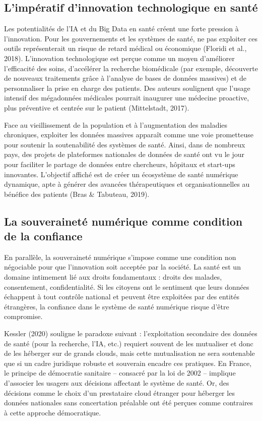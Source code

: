 \documentclass[10pt,a4paper]{article} %
\begin{document}
\subsection{L’impératif d’innovation technologique en santé}

Les potentialités de l’IA et du Big Data en santé créent une forte pression à l’innovation. Pour les gouvernements et les systèmes de santé, ne pas exploiter ces outils représenterait un risque de retard médical ou économique (Floridi et al., 2018). L’innovation technologique est perçue comme un moyen d’améliorer l’efficacité des soins, d’accélérer la recherche biomédicale (par exemple, découverte de nouveaux traitements grâce à l’analyse de bases de données massives) et de personnaliser la prise en charge des patients. Des auteurs soulignent que l’usage intensif des mégadonnées médicales pourrait inaugurer une médecine proactive, plus préventive et centrée sur le patient (Mittelstadt, 2017).

Face au vieillissement de la population et à l’augmentation des maladies chroniques, exploiter les données massives apparaît comme une voie prometteuse pour soutenir la soutenabilité des systèmes de santé. Ainsi, dans de nombreux pays, des projets de plateformes nationales de données de santé ont vu le jour pour faciliter le partage de données entre chercheurs, hôpitaux et start-ups innovantes. L’objectif affiché est de créer un écosystème de santé numérique dynamique, apte à générer des avancées thérapeutiques et organisationnelles au bénéfice des patients (Bras \& Tabuteau, 2019).

\subsection{La souveraineté numérique comme condition de la confiance}

En parallèle, la souveraineté numérique s’impose comme une condition non négociable pour que l’innovation soit acceptée par la société. La santé est un domaine intimement lié aux droits fondamentaux : droits des malades, consentement, confidentialité. Si les citoyens ont le sentiment que leurs données échappent à tout contrôle national et peuvent être exploitées par des entités étrangères, la confiance dans le système de santé numérique risque d’être compromise.

Kessler (2020) souligne le paradoxe suivant : l’exploitation secondaire des données de santé (pour la recherche, l’IA, etc.) requiert souvent de les mutualiser et donc de les héberger sur de grands clouds, mais cette mutualisation ne sera soutenable que si un cadre juridique robuste et souverain encadre ces pratiques. En France, le principe de démocratie sanitaire – consacré par la loi de 2002 – implique d’associer les usagers aux décisions affectant le système de santé. Or, des décisions comme le choix d’un prestataire cloud étranger pour héberger les données nationales sans concertation préalable ont été perçues comme contraires à cette approche démocratique.
\end{document}
